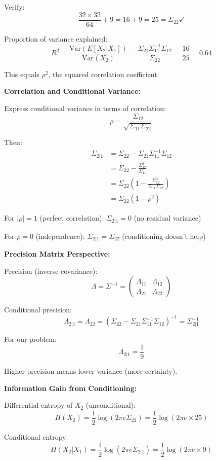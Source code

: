 \documentclass[12pt]{article}
\begin{document}
\begin{explanation}
Verify:
\[
\frac{32 \times 32}{64} + 9 = 16 + 9 = 25 = \Sigma_{22} \checkmark
\]

Proportion of variance explained:
\[
R^2 = \frac{\text{Var}(E[X_2|X_1])}{\text{Var}(X_2)} = \frac{\Sigma_{21}\Sigma_{11}^{-1}\Sigma_{12}}{\Sigma_{22}} = \frac{16}{25} = 0.64
\]

This equals $\rho^2$, the squared correlation coefficient.

\textbf{Correlation and Conditional Variance:}

Express conditional variance in terms of correlation:
\[
\rho = \frac{\Sigma_{12}}{\sqrt{\Sigma_{11}\Sigma_{22}}}
\]

Then:
\begin{align*}
\Sigma_{2|1} &= \Sigma_{22} - \Sigma_{21}\Sigma_{11}^{-1}\Sigma_{12} \\
&= \Sigma_{22} - \frac{\Sigma_{12}^2}{\Sigma_{11}} \\
&= \Sigma_{22}\left(1 - \frac{\Sigma_{12}^2}{\Sigma_{11}\Sigma_{22}}\right) \\
&= \Sigma_{22}(1 - \rho^2)
\end{align*}

For $|\rho| = 1$ (perfect correlation): $\Sigma_{2|1} = 0$ (no residual variance)

For $\rho = 0$ (independence): $\Sigma_{2|1} = \Sigma_{22}$ (conditioning doesn't help)

\textbf{Precision Matrix Perspective:}

Precision (inverse covariance):
\[
\Lambda = \Sigma^{-1} = \begin{pmatrix} \Lambda_{11} & \Lambda_{12} \\ \Lambda_{21} & \Lambda_{22} \end{pmatrix}
\]

Conditional precision:
\[
\Lambda_{2|1} = \Lambda_{22} = (\Sigma_{22} - \Sigma_{21}\Sigma_{11}^{-1}\Sigma_{12})^{-1} = \Sigma_{2|1}^{-1}
\]

For our problem:
\[
\Lambda_{2|1} = \frac{1}{9}
\]

Higher precision means lower variance (more certainty).

\textbf{Information Gain from Conditioning:}

Differential entropy of $X_2$ (unconditional):
\[
H(X_2) = \frac{1}{2}\log(2\pi e \Sigma_{22}) = \frac{1}{2}\log(2\pi e \times 25)
\]

Conditional entropy:
\[
H(X_2 | X_1) = \frac{1}{2}\log(2\pi e \Sigma_{2|1}) = \frac{1}{2}\log(2\pi e \times 9)
\]


\end{explanation}
\end{document}
